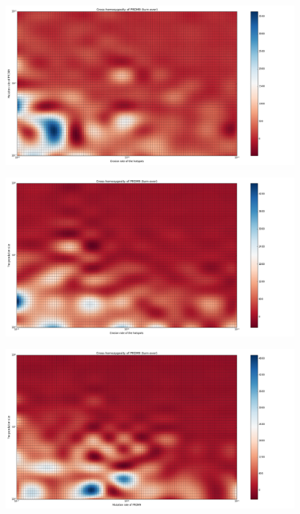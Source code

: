 \documentclass[10pt]{beamer}
\begin{document}
\begin{frame}
	\begin{center}
       \includegraphics[width=11cm]{Images/cross-homozygosity-mutation-erosion.png}
	\end{center}
\end{frame}


\begin{frame}
	\begin{center}
       \includegraphics[width=11cm]{Images/cross-homozygosity-population-erosion.png}
	\end{center}
\end{frame}

\begin{frame}
	\begin{center}
       \includegraphics[width=11cm]{Images/cross-homozygosity-population-mutation.png}
	\end{center}
\end{frame}
\end{document}
